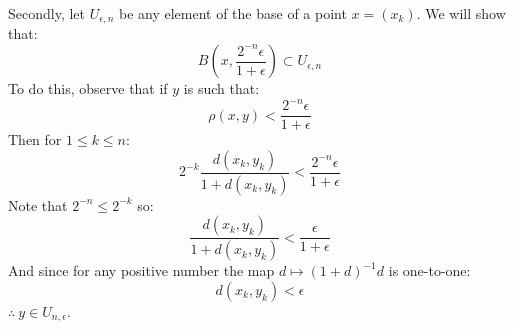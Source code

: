 Secondly, let $U_{\epsilon, n}$ be any element of the base of a point $x=(x_k)$. We will show that:
$$B(x,\frac{2^{-n}\epsilon}{1+\epsilon}) \subset U_{\epsilon, n}$$
To do this, observe that if $y$ is such that:
$$\rho(x,y)<\frac{2^{-n}\epsilon}{1+\epsilon}$$
Then for $1\leq k \leq n$:
$$2^{-k} \frac{d(x_k,y_k)}{1+d(x_k,y_k)} < \frac{2^{-n}\epsilon}{1+\epsilon}$$
Note that $2^{-n}\leq 2^{-k}$ so:
$$ \frac{d(x_k,y_k)}{1+d(x_k,y_k)} < \frac{\epsilon}{1+\epsilon}$$
And since for any positive number the map $d\mapsto (1+d)^{-1}d$ is one-to-one:
$$d(x_k,y_k)<\epsilon$$
$\therefore \ y\in U_{n,\epsilon}$.
